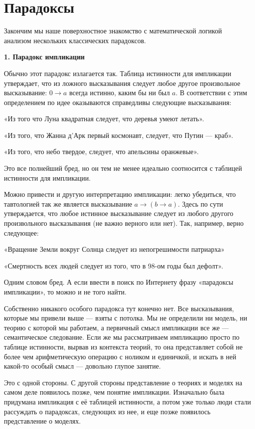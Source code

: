 \section{Парадоксы}

Закончим мы наше поверхностное знакомство с математической логикой анализом нескольких классических парадоксов.

{\bfseries 1. Парадокс импликации}

Обычно этот парадокс излагается так. Таблица истинности для импликации утверждает, что из ложного высказывания следует любое другое произвольное высказывание: $0 \rightarrow a$ всегда истинно, каким бы ни был $a$. В соответствии с этим определением по идее оказываются справедливы следующие высказывания:

«Из того что Луна квадратная следует, что деревья умеют летать».

«Из того, что Жанна д’Арк первый космонавт, следует, что Путин — краб».

«Из того, что небо твердое, следует, что апельсины оранжевые».

Это все полнейший бред, но он тем не менее идеально соотносится с таблицей истинности для импликации.

Можно привести и другую интерпретацию импликации: легко убедиться, что тавтологией так же является высказывание $a \rightarrow (b \rightarrow a)$. Здесь по сути утверждается, что любое истинное высказывание следует из любого другого произвольного высказывания (не важно верного или нет). Так, например, верно следующее:

«Вращение Земли вокруг Солнца следует из непогрешимости патриарха»

«Смертность всех людей следует из того, что в 98-ом годы был дефолт».

Одним словом бред. А если ввести в поиск по Интернету фразу «парадоксы импликации», то можно и не того найти.

Собственно никакого особого парадокса тут конечно нет. Все высказывания, которые мы привели выше — взяты с потолка. Мы не определили ни модель, ни теорию с которой мы работаем, а первичный смысл импликации все же — семантическое следование. Если же мы рассматриваем импликацию просто по таблице истинности, вырвав из контекста теорий, то она представляет собой не более чем арифметическую операцию с ноликом и единичкой, и искать в ней какой-то особый смысл — довольно глупое занятие.

Это с одной стороны. С другой стороны представление о теориях и моделях на самом деле появилось позже, чем понятие импликации. Изначально была придумана импликация с её  таблицей истинности, а потом уже только люди стали рассуждать о парадоксах, следующих из нее, и еще позже появилось представление о моделях.

